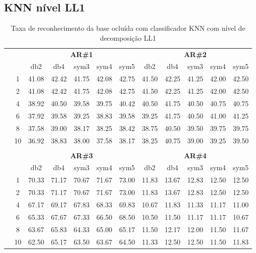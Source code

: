 \subsection{KNN nível LL1}

\begin{table}[H]
	\centering
    \normalsize
	\caption{Taxa de reconhecimento da base ocluída com classificador KNN com nível de decomposição LL1}
	\begin{tabular}{|c|c|c c c c c|c c c c c|}
\cline{3-12}
\multicolumn{2}{c|}{\multirow{2}{*}{}} & \multicolumn{5}{c|}{\textbf{AR\#1}}  & \multicolumn{5}{c|}{\textbf{AR\#2}} \\\cline{3-12}

\multicolumn{2}{c|}{}  & db2 & db4 & sym3 & sym4 & sym5 & db2 & db4& sym3 & sym4 & sym5 \\\hline
\multicolumn{1}{|c|}{ \multirow{5}{*}{\rotatebox[origin=c]{90}{\textbf{K-vizinhos}}} }
&1	&41.08	&42.42	&41.75	&42.08	&42.75	&41.50	&42.25	&41.25	&42.00	&42.50	\\\cline{2-12}
&2	&41.08	&42.42	&41.75	&42.08	&42.75	&41.50	&42.25	&41.25	&42.00	&42.50	\\\cline{2-12}
&4	&38.92	&40.50	&39.58	&39.75	&40.42	&40.50	&41.75	&40.50	&40.75	&40.75	\\\cline{2-12}
&6	&37.92	&39.58	&39.25	&38.83	&39.58	&39.25	&41.75	&40.50	&41.00	&41.25	\\\cline{2-12}
&8	&37.58	&39.00	&38.17	&38.25	&38.42	&38.75	&40.50	&39.50	&39.75	&39.75	\\\cline{2-12}
&10	&36.92	&38.83	&38.00	&37.58	&38.17	&38.25	&40.75	&39.00	&39.25	&39.50	


\\ \midrule
\multicolumn{12}{c}{}\\ 

\cline{3-12}
\multicolumn{2}{c}{} & \multicolumn{5}{|c|}{\textbf{AR\#3}}  & \multicolumn{5}{c|}{\textbf{AR\#4}} \\\cline{3-12}
\multicolumn{2}{c}{}  & \multicolumn{1}{|c}{db2} & db4 & sym3 & sym4 & sym5 & db2 & db4& sym3 & sym4 & sym5 \\\hline
\multicolumn{1}{|c|}{ \multirow{6}{*}{\rotatebox[origin=c]{90}{\textbf{K-vizinhos}}} }
&1	&70.33&	71.17&	70.67&	71.67&	73.00&	11.83	&13.67&	12.83&	12.50&	12.50	\\\cline{2-12}
&2	&70.33&	71.17&	70.67&	71.67&	73.00&	11.83	&13.67&	12.83&	12.50&	12.50	\\\cline{2-12}
&4	&67.17&	69.17&	67.83&	68.33&	69.83&	10.67	&11.83&	11.33&	11.17&	11.00	\\\cline{2-12}
&6	&65.33&	67.67&	67.33&	66.50&	68.50&	10.50	&11.50&	11.17&	11.17&	10.67	\\\cline{2-12}
&8	&63.67&	65.83&	64.33&	65.00&	65.17&	11.50	&12.17&	12.00&	11.50&	11.67	\\\cline{2-12}
&10	&62.50&	65.17&	63.50&	63.67&	64.50&	11.33	&12.50&	12.50&	11.50&	11.83	\\\midrule
\end{tabular}

\end{table}


